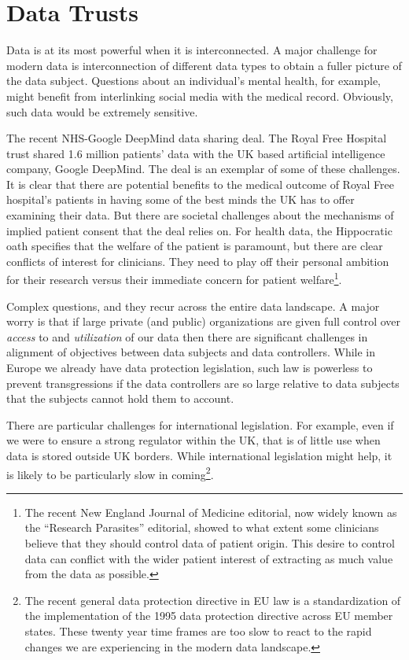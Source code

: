 \documentclass[a4paper]{caesar_book}
\let\oldchapter\chapter
\def\chapter{%
  \setcounter{footnote}{0}%
  \oldchapter
}
\begin{document}
\chapter{Data Trusts}

Data is at its most powerful when it is interconnected. A major challenge for modern data is interconnection of different data types to obtain a fuller picture of the data subject. Questions about an individual’s mental health, for example, might benefit from interlinking social media with the medical record. Obviously, such data would be extremely sensitive.

The recent NHS-Google DeepMind data sharing deal. The Royal Free Hospital trust shared 1.6 million patients’ data with the UK based artificial intelligence company, Google DeepMind. The deal is an exemplar of some of these challenges. It is clear that there are potential benefits to the medical outcome of Royal Free hospital’s patients in having some of the best minds the UK has to offer examining their data. But there are societal challenges about the mechanisms of implied patient consent that the deal relies on. For health data, the Hippocratic oath specifies that the welfare of the patient is paramount, but there are clear conflicts of interest for clinicians. They need to play off their personal ambition for their research versus their immediate concern for patient welfare\footnote{The recent New England Journal of Medicine editorial, now widely known as the ``Research Parasites'' editorial, showed to what extent some clinicians believe that they should control data of patient origin. This desire to control data can conflict with the wider patient interest of extracting as much value from the data as possible.}.

Complex questions, and they recur across the entire data landscape. A major worry is that if large private (and public) organizations are given full control over \textit{access} to and \textit{utilization} of our data then there are significant challenges in alignment of objectives between data subjects and data controllers. While in Europe we already have data protection legislation, such law is powerless to prevent transgressions if the data controllers are so large relative to data subjects that the subjects cannot hold them to account.

There are particular challenges for international legislation. For example, even if we were to ensure a strong regulator within the UK, that is of little use when data is stored outside UK borders. While international legislation might help, it is likely to be particularly slow in coming\footnote{The recent general data protection directive in EU law is a standardization of the implementation of the 1995 data protection directive across EU member states. These twenty year time frames are too slow to react to the rapid changes we are experiencing in the modern data landscape.}.
\end{document}
